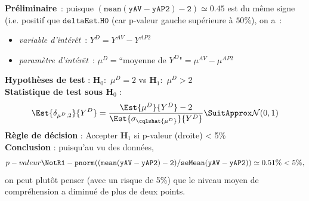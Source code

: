\documentclass[10pt]{report}
\begin{document}
\begin{exercice}
\begin{enumerate}
 

\begin{Correction}
\noindent \textbf{Préliminaire}~: puisque  $\mathtt{(mean(yAV-yAP2)-2)}\simeq0.45$ est du même signe (i.e. positif que $\mathtt{deltaEst.H0}$ (car p-valeur gauche supérieure à $50\%$), on a~:
    \begin{itemize}
\item \textit{variable d'intérêt}~: $Y^{D}=Y^{AV}-Y^{AP2}$
\item \textit{paramètre d'intérêt}~: $\mu^{D}=\mbox{``moyenne de $Y^{D}$"}=\mu^{AV}-\mu^{AP2}$
\end{itemize}
\noindent \textbf{Hypothèses de test} : $\mathbf{H}_0:$ $\mu^{D}=2$ vs {\large $\mathbf{H}_1:$ $\mu^{D}>2$}\\
\textbf{Statistique de test sous $\mathbf{H}_0$} :
  $$
  \Est{\delta_{\mu^{D},2}}{Y^{D}}= {\displaystyle \frac{\Est{\mu^{D}}{Y^{D}}-2}{
\Est{\sigma_{\cqlshat{\mu^{D}}}}{Y^{D}}
}} 
  \SuitApprox \mathcal{N}(0,1)
  $$
\textbf{Règle de décision} : Accepter $\mathbf{H}_1$ si 
  p-valeur (droite) < 5\%\\
\noindent \textbf{Conclusion} :
puisqu'au vu des données, 
  \[
p-valeur\NotR\mathtt{1-pnorm((mean(yAV-yAP2)-2)/seMean(yAV-yAP2))} \simeq 0.51\% < 5\%,
\]
on peut plutôt penser (avec un risque de 5\%) que le niveau moyen de compréhension a diminué de plus de deux points.
\end{Correction}




\end{enumerate}
 
\end{exercice}
\end{document}
